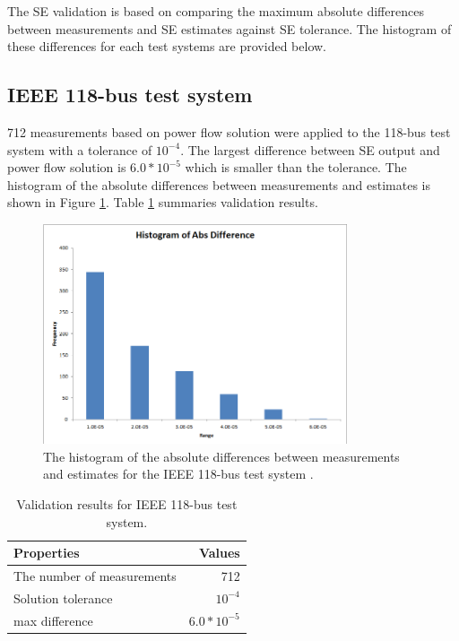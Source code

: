\documentclass[a4paper]{article}
\begin{document}
The SE validation is based on comparing the maximum absolute differences between measurements and SE estimates against SE tolerance. The histogram of these differences for each test systems are provided below.

\subsection{IEEE 118-bus test system}
\label{sec:118}

712 measurements based on power flow solution were applied to the 118-bus test system with a tolerance of $10^{-4}$.  The largest difference between SE output and power flow solution is $6.0*10^{-5}$ which is smaller than the tolerance.  The histogram of the absolute differences between measurements and estimates is shown in Figure  \ref{fig:118}.  Table \ref{tab:118} summaries validation results.

\begin{figure}[ht]
\centering
\includegraphics[width=0.8\textwidth]{118.png}
\caption{The histogram of the absolute differences between measurements and estimates for the IEEE 118-bus test system .}
\label{fig:118}
\end{figure}

\begin{table} [h]
\centering
\begin{tabular}{l|r}
Properties & Values \\\hline
The number of measurements & 712 \\
Solution tolerance	& $10^{-4}$ \\
max difference	&  $6.0*10^{-5}$ 
\end{tabular}
\caption{\label{tab:118} Validation results for IEEE 118-bus test system.}
\end{table}
\end{document}
